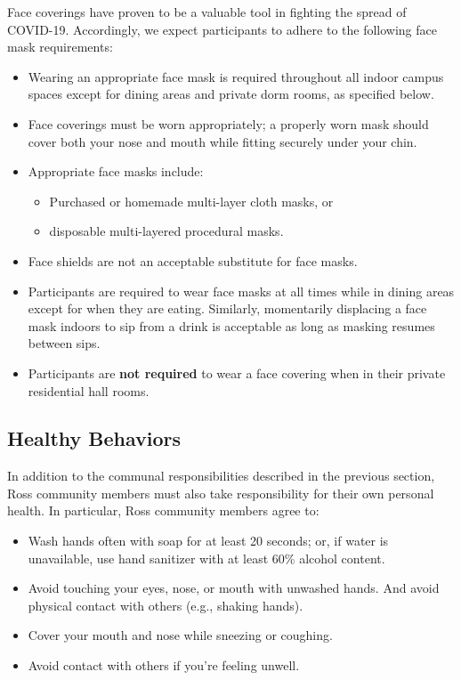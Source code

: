 \documentclass{ross}
\begin{document}
Face coverings have proven to be a valuable tool in fighting the spread of COVID-19. Accordingly, we expect participants to adhere to the following face mask requirements:
\begin{itemize}
    \item Wearing an appropriate face mask is required throughout all indoor campus spaces except for dining areas and private dorm rooms, as specified below.
    \item Face coverings must be worn appropriately; a properly worn mask should cover both your nose and mouth while fitting securely under your chin.
    \item Appropriate face masks include:
    \begin{itemize}
        \item Purchased or homemade multi-layer cloth masks, or
        \item disposable multi-layered procedural masks.
    \end{itemize}
    \item Face shields are not an acceptable substitute for face masks.
    \item Participants are required to wear face masks at all times while in dining areas except for when they are eating. Similarly, momentarily displacing a face mask indoors to sip from a drink is acceptable as long as masking resumes between sips. 
    \item Participants are {\bf not required} to wear a face covering when in their private residential hall rooms.
    
\end{itemize}

\subsection*{Healthy Behaviors}

In addition to the communal responsibilities described in the previous section, Ross community members must also take responsibility for their own personal health. In particular, Ross community members agree to:

\begin{itemize}
    \item Wash hands often with soap for at least 20 seconds; or, if water is unavailable, use hand sanitizer with at least 60\% alcohol content.
    \item Avoid touching your eyes, nose, or mouth with unwashed hands. And avoid physical contact with others (e.g., shaking hands).
    \item Cover your mouth and nose while sneezing or coughing.
    \item Avoid contact with others if you're feeling unwell. 
\end{itemize}
\end{document}
